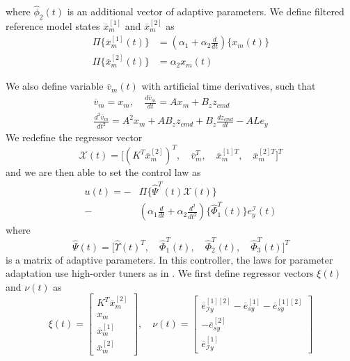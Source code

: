 \documentclass[english]{ifacconf}
\begin{document}
where $\hat{\phi}_2(t)$ is an additional vector of adaptive parameters. We define filtered reference model states $\overline{x}_m^{[1]}$ and $\overline{x}_m^{[2]}$ as
\begin{equation}
\begin{aligned}
	\Pi \big \{  \overline{x}_{m}^{[1]} (t) \big \} &= (\alpha_1 + \alpha_2 \frac{d}{dt}) \big \{ x_m (t) \big \} \\
	\Pi \big \{  \overline{x}_{m}^{[2]}(t) \big \} &= \alpha_2 x_m (t)
\end{aligned}	
\end{equation}

We also define variable $\overline{v}_m(t)$ with artificial time derivatives, such that
\begin{equation}
\begin{gathered}
	\overline{v}_m = x_m, \quad \frac{d \overline{v}_m}{dt}  = A x_m + B_z z_{cmd} \\
	\frac{d^2 \overline{v}_m}{dt^2}  = A^2 x_m + A B_z z_{cmd} + B_z \frac{dz_{cmd}}{dt} - A L e_y
\end{gathered}
\end{equation}
We redefine the regressor vector
\begin{equation}
\mathcal{X}(t) = \big[ (K^T \overline{x}_m^{[2]})^T,\quad \overline{v}_m^T,\quad \overline{x}_m^{[1]T},\quad \overline{x}_m^{[2]T} \big]^T
\end{equation}
and we are then able to set the control law as
\begin{equation}
\begin{aligned}
	u (t) = -&\Pi \big \{ \hat{\Psi}^T(t) \mathcal{X}(t) \big \} \\ - & (\alpha_1 \frac{d}{dt} + \alpha_2 \frac{d^2}{dt^2}) \big \{ \hat{\Phi}_1^T(t) \big \} e_y^\mathcal{I} (t)
\end{aligned}
\end{equation}
where 
\begin{equation}
\hat{\Psi}(t) = \big[ \hat{\Upsilon}(t)^T,\quad \hat{\Phi}_1^T(t),\quad \hat{\Phi}_2^T(t),\quad \hat{\Phi}_3^T(t) \big]^T 
\end{equation}
is a matrix of adaptive parameters. In this controller, the laws for parameter adaptation use high-order tuners as in \cite{qu2016phd}. We first define regressor vectors $\xi(t)$ and $\nu(t)$ as
\begin{equation}
	\xi(t) = \begin{bmatrix}
		K^T \overline{x}_m^{[2]} \\ x_m \\ \overline{x}_m^{[1]} \\ \overline{x}_m^{[2]}
	\end{bmatrix}, \quad \nu(t) = \begin{bmatrix}
		\overline{e}_{\mathcal{I}y}^{[1][2]} - \overline{e}_{sy}^{[1]} - \overline{e}_{sy}^{[1][2]} \\ -\overline{e}_{sy}^{[2]} \\ \overline{e}_{\mathcal{I}y}^{[1]}
	\end{bmatrix}
\end{equation}
\end{document}
